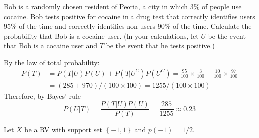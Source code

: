 \documentclass[addpoints,12pt]{exam}
\begin{document}
\begin{questions}
\question[20] Bob is a randomly chosen resident of Peoria, a city in which 3\% of people use cocaine.  Bob tests positive for cocaine in a drug test that correctly identifies users 95\% of the time and correctly identifies non-users 90\% of the time. Calculate the probability that Bob is a cocaine user. (In your calculations, let $U$ be the event that Bob is a cocaine user and $T$ be the event that he tests positive.)
\begin{solution}[2.5in]
  By the law of total probability:
  \begin{align*}
    P(T) &= P(T|U)P(U) + P(T|U^C)P(U^C) = \frac{95}{100} \times \frac{3}{100} + \frac{10}{100}\times \frac{97}{100}\\
    &= (285 + 970) / (100 \times 100) = 1255 / (100 \times 100)
  \end{align*}
Therefore, by Bayes' rule
\[
  P(U|T) = \frac{P(T|U)P(U)}{P(T)} = \frac{285}{1255} \approx 0.23
\]
\end{solution}

\question Let $X$ be a RV with support set $\left\{ -1,1 \right\}$ and $p(-1) = 1/2$. 
\end{questions}
\end{document}
